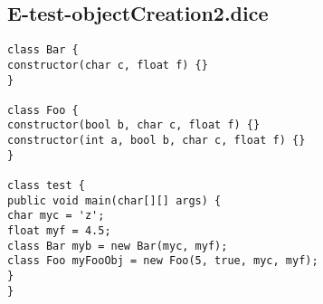 \subsection{E-test-objectCreation2.dice}
\begin{verbatim}
class Bar {
constructor(char c, float f) {}
}

class Foo {
constructor(bool b, char c, float f) {}
constructor(int a, bool b, char c, float f) {}
}

class test {
public void main(char[][] args) {
char myc = 'z';
float myf = 4.5;
class Bar myb = new Bar(myc, myf);
class Foo myFooObj = new Foo(5, true, myc, myf);
}
}
\end{verbatim}